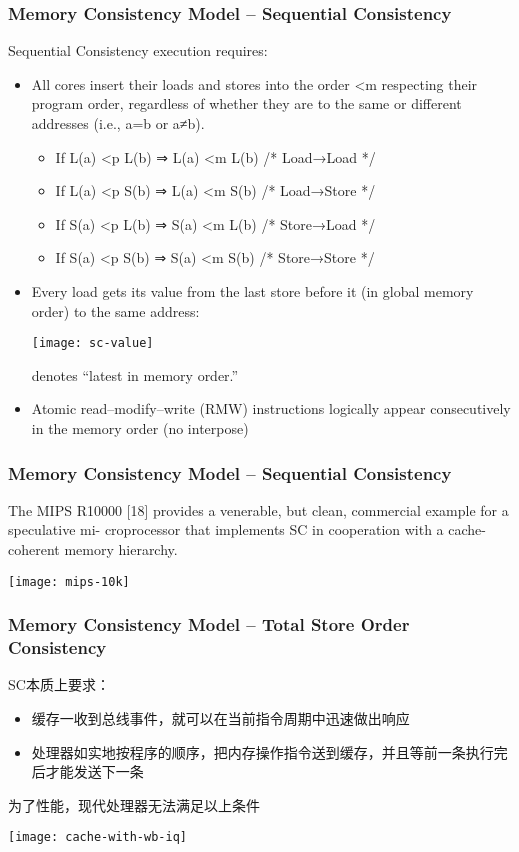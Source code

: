 \begin{frame}[plain]	
    \frametitle{Memory Consistency Model --  Sequential Consistency}
    Sequential Consistency execution requires:


    \begin{itemize}
        \item All cores insert their loads and stores into the order <m respecting their program order,
        regardless of whether they are to the same or different addresses (i.e., a=b or a≠b). 
        \begin{itemize}
            \item If L(a) <p L(b) ⇒ L(a) <m L(b) /* Load→Load */
            \item If L(a) <p S(b) ⇒ L(a) <m S(b) /* Load→Store */
            \item If S(a) <p L(b) ⇒ S(a) <m L(b) /* Store→Load */
            \item If S(a) <p S(b) ⇒ S(a) <m S(b) /* Store→Store */

        \end{itemize}
        \pause
        \item Every load gets its value from the last store before it (in global memory order) to the same
        address:
        
        \texttt{[image: sc-value]}
        
        denotes “latest in   memory order.”
        
        \pause
        \item Atomic read–modify–write (RMW) instructions logically appear consecutively in the memory order (no interpose)
        
    \end{itemize}
\end{frame}


\begin{frame}[plain]	
    \frametitle{Memory Consistency Model --  Sequential Consistency}
The MIPS R10000 [18] provides a venerable, but clean, commercial example for a speculative mi-
croprocessor that implements SC in cooperation with a cache-coherent memory hierarchy.
    
 \texttt{[image: mips-10k]}
\end{frame}


\begin{frame}[plain]	
    \frametitle{Memory Consistency Model --  Total Store Order  Consistency}
   SC本质上要求：
    \begin{itemize}
        \item 缓存一收到总线事件，就可以在当前指令周期中迅速做出响应
        \item 处理器如实地按程序的顺序，把内存操作指令送到缓存，并且等前一条执行完后才能发送下一条
    \end{itemize}
    为了性能，现代处理器无法满足以上条件
    
    \centering
    \texttt{[image: cache-with-wb-iq]}
\end{frame}

